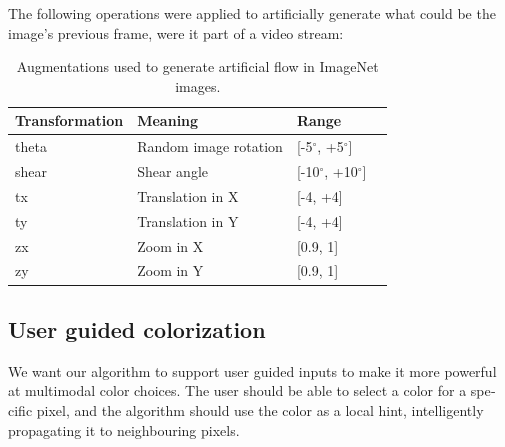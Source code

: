 \documentclass[12pt,openright,oneside,a4paper,english]{abntex2}
\begin{document}
\begin{otherlanguage}{english}
    The following operations were applied to artificially generate what could be the image's previous frame, were it part of a video stream:

    \begin{table}[H]
        \centering
        \begin{tabular}{llll}
        Transformation & Meaning               & Range          &  \\ \hline
        theta          & Random image rotation & [-5$^{\circ}$, +5$^{\circ}$]   &  \\
        shear          & Shear angle           & [-10$^{\circ}$, +10$^{\circ}$] &  \\ \hline
        tx             & Translation in X      & [-4, +4]       &  \\
        ty             & Translation in Y      & [-4, +4]       &  \\ \hline
        zx             & Zoom in X             & [0.9, 1]       &  \\
        zy             & Zoom in Y             & [0.9, 1]       &  \\ \hline
        \end{tabular}
        \label{table:augmentations_imagenet}
        \caption{Augmentations used to generate artificial flow in ImageNet images.}
    \end{table}







    \subsection{User guided colorization}
    We want our algorithm to support user guided inputs to make it more powerful at multimodal color choices. The user should be able to select a color for a specific pixel, and the algorithm should use the color as a local hint, intelligently propagating it to neighbouring pixels.


\end{otherlanguage}
\end{document}
